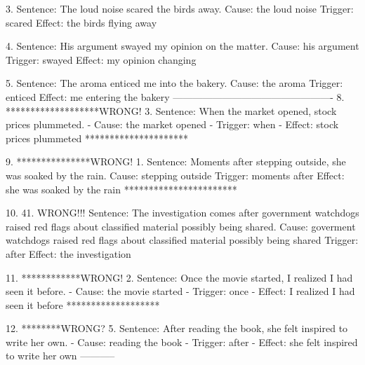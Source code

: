 3. Sentence: The loud noise scared the birds away.
   Cause: the loud noise
   Trigger: scared
   Effect: the birds flying away

4. Sentence: His argument swayed my opinion on the matter.
   Cause: his argument
   Trigger: swayed
   Effect: my opinion changing

5. Sentence: The aroma enticed me into the bakery.
   Cause: the aroma
   Trigger: enticed
   Effect: me entering the bakery
-------------------------------------------------
8.
*******************WRONG!
3. Sentence: When the market opened, stock prices plummeted.
   - Cause: the market opened
   - Trigger: when
   - Effect: stock prices plummeted
*********************

9.
***************WRONG!
1. Sentence: Moments after stepping outside, she was soaked by the rain.
   Cause: stepping outside
   Trigger: moments after
   Effect: she was soaked by the rain
***********************

10.
41. WRONG!!!
Sentence: The investigation comes after government watchdogs raised red flags about classified material possibly being shared.
Cause: goverment watchdogs raised red flags about classified material possibly being shared
Trigger: after
Effect: the investigation

11.
************WRONG!
2. Sentence: Once the movie started, I realized I had seen it before.
   - Cause: the movie started
   - Trigger: once
   - Effect: I realized I had seen it before
*******************

12.
********WRONG?
5. Sentence: After reading the book, she felt inspired to write her own.
   - Cause: reading the book
   - Trigger: after
   - Effect: she felt inspired to write her own
-----------
